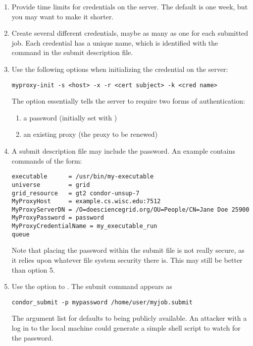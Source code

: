 \begin{enumerate}

\item{Provide time limits}
for credentials on the  server.
The default is one week, but you may want to make it shorter.

\item{Create several different  credentials},
maybe as many as one for each submitted job.
Each credential has a unique name,
which is identified with the
 command in the submit description file.

\item{Use the following options}
when initializing the credential on the  server:

\footnotesize
\begin{verbatim}
myproxy-init -s <host> -x -r <cert subject> -k <cred name>
\end{verbatim}
\normalsize

The option 
essentially tells the  server to require two forms
of authentication:
  \begin{enumerate}
  \item{a password (initially set with )}
  \item{an existing proxy (the proxy to be renewed)}
  \end{enumerate}

\item{A submit description file may include the password.}
An example contains commands of the form:
\footnotesize
\begin{verbatim}
executable      = /usr/bin/my-executable
universe        = grid
grid_resource   = gt2 condor-unsup-7
MyProxyHost     = example.cs.wisc.edu:7512
MyProxyServerDN = /O=doesciencegrid.org/OU=People/CN=Jane Doe 25900
MyProxyPassword = password
MyProxyCredentialName = my_executable_run
queue
\end{verbatim}
\normalsize
Note that placing the password within the submit file
is not really secure,
as it relies upon whatever file system security there is.
This may still be better than option 5.

\item{Use the  option to .}
The submit command appears as
\footnotesize
\begin{verbatim}
condor_submit -p mypassword /home/user/myjob.submit
\end{verbatim}
\normalsize
The argument list for  defaults to
being publicly available.
An attacker with a log in to the local machine could
generate a simple shell script
to watch for the password. 

\end{enumerate}

